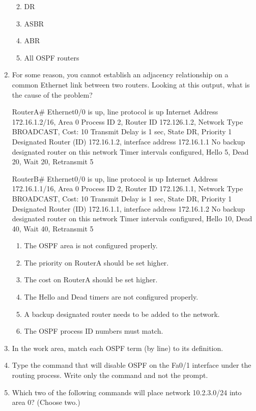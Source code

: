 \begin{enumerate}
  \begin{enumerate}
  \def\labelenumii{\Alph{enumii}.}
    \item
    DR
  \item
    ASBR
  \item
    \protect\hypertarget{c18.xhtmlux5cux23Page_779}{}{}ABR
  \item
    All OSPF routers
  \end{enumerate}
\item
  For some reason, you cannot establish an adjacency relationship on a
  common Ethernet link between two routers. Looking at this output, what
  is the cause of the problem?

\begin{cli}
RouterA#
Ethernet0/0 is up, line protocol is up
  Internet Address 172.16.1.2/16, Area 0
  Process ID 2, Router ID 172.126.1.2, Network Type BROADCAST, Cost: 10
  Transmit Delay is 1 sec, State DR, Priority 1
  Designated Router (ID) 172.16.1.2, interface address 172.16.1.1
  No backup designated router on this network
  Timer intervals configured, Hello 5, Dead 20, Wait 20, Retransmit 5

RouterB#
Ethernet0/0 is up, line protocol is up
  Internet Address 172.16.1.1/16, Area 0
  Process ID 2, Router ID 172.126.1.1, Network Type BROADCAST, Cost: 10
  Transmit Delay is 1 sec, State DR, Priority 1
  Designated Router (ID) 172.16.1.1, interface address 172.16.1.2
  No backup designated router on this network
  Timer intervals configured, Hello 10, Dead 40, Wait 40, Retransmit 5
\end{cli}

  \begin{enumerate}
  \def\labelenumii{\Alph{enumii}.}
    \item
    The OSPF area is not configured properly.
  \item
    The priority on RouterA should be set higher.
  \item
    The cost on RouterA should be set higher.
  \item
    The Hello and Dead timers are not configured properly.
  \item
    A backup designated router needs to be added to the network.
  \item
    The OSPF process ID numbers must match.
  \end{enumerate}
\item
  In the work area, match each OSPF term (by line) to its definition.

  \begin{figure}
  \centering
  \caption{}
  \end{figure}
\item
  Type the command that will disable OSPF on the Fa0/1 interface under
  the routing process. Write only the command and not the prompt.
\item
  \protect\hypertarget{c18.xhtmlux5cux23Page_780}{}{}Which two of the
  following commands will place network 10.2.3.0/24 into area 0? (Choose
  two.)


\end{enumerate}
